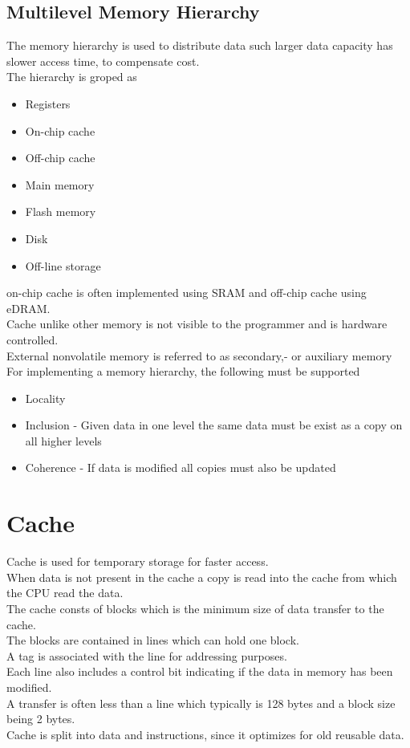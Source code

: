 \documentclass[12pt, a4paper]{article}
\begin{document}
		\subsection{Multilevel Memory Hierarchy}
			The memory hierarchy is used to distribute data such larger data capacity has slower access time, to compensate cost.\\
			 The hierarchy is groped as
			 \begin{itemize}
			 	\item Registers
			 	\item On-chip cache
			 	\item Off-chip cache
			 	\item Main memory
			 	\item Flash memory
			 	\item Disk
			 	\item Off-line storage
			\end{itemize}
			on-chip cache is often implemented using SRAM and off-chip cache using eDRAM.\\
			Cache unlike other memory is not visible to the programmer and is hardware controlled.\\
			External nonvolatile memory is referred to as secondary,- or auxiliary memory\\
			For implementing a memory hierarchy, the following must be supported
			\begin{itemize}
				\item Locality 
				\item Inclusion - Given data in one level the same data must be exist as a copy on all higher levels
				\item Coherence - If data is modified all copies must also be updated
			\end{itemize}
	\section{Cache}
		Cache is used for temporary storage for faster access.\\
		When data is not present in the cache a copy is read into the cache from which the CPU read the data.\\
		The cache consts of blocks which is the minimum size of data transfer to the cache.\\
		The blocks are contained in lines which can hold one block.\\
		A tag is associated with the line for addressing purposes.\\
		Each line also includes a control bit indicating if the data in memory has been modified.\\
		A transfer is often less than a line which typically is 128 bytes and a block size being 2 bytes.\\
		Cache is split into data and instructions, since it optimizes for old reusable data.
\end{document}
